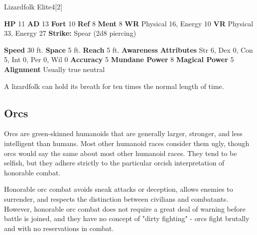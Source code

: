   \begin{monsubsection}{Lizardfolk Elite}{4}[2]
    \vspace{-1em}\vspace{-1em}
    \vspace{0em}

    
    

    \begin{spellcontent}
      \begin{spelltargetinginfo}
        \pari \textbf{HP} 11 \monsep
          \textbf{AD} 13 \monsep
          \textbf{Fort} 10 \monsep
          \textbf{Ref} 8 \monsep
          \textbf{Ment} 8
        \pari \textbf{WR} Physical 16, Energy 10 \monsep
        \textbf{VR} Physical 33, Energy 27
        \pari \textbf{Strike:}
            Spear  (2d8 piercing)
      \end{spelltargetinginfo}
    \end{spellcontent}
    \begin{monsterfooter}
      \pari \textbf{Speed} 30 ft. \monsep
        \textbf{Space} 5 ft. \monsep
        \textbf{Reach} 5 ft.
      \pari \textbf{Awareness} 
      \pari \textbf{Attributes}
        Str 6, Dex 0,
        Con 5, Int 0,
        Per 0, Wil 0
      \pari \textbf{Accuracy} 5 \monsep
        \textbf{Mundane Power} 8 \monsep
      \textbf{Magical Power} 5
      \pari \textbf{Alignment} Usually true neutral
    \end{monsterfooter}
  \end{monsubsection}
   A lizardfolk can hold its breath for ten times the normal length of time.
  
  
    \subsection{Orcs}
      
      Orcs are green-skinned humanoids that are generally larger, stronger, and less intelligent than humans.
      Most other humanoid races consider them ugly, though orcs would say the same about most other humanoid races.
      They tend to be selfish, but they adhere strictly to the particular orcish interpretation of honorable combat.
    
      Honorable orc combat avoids sneak attacks or deception, allows enemies to surrender, and respects the distinction between civilians and combatants.
      However, honorable orc combat does not require a great deal of warning before battle is joined, and they have no concept of "dirty fighting" - orcs fight brutally and with no reservations in combat.

